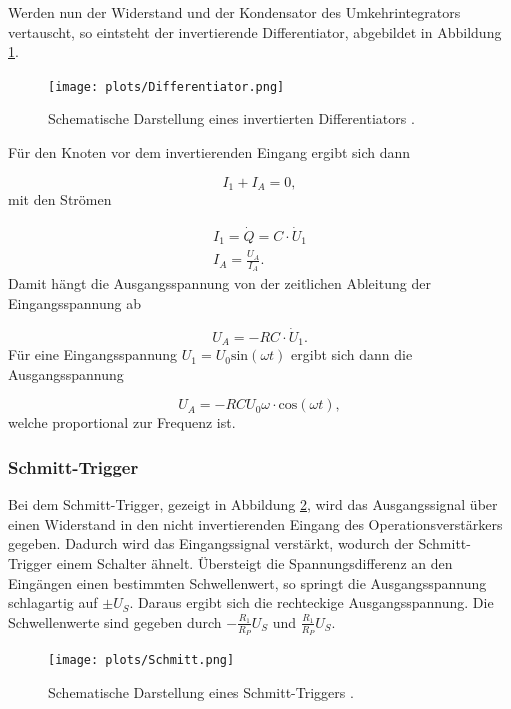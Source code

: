Werden nun der Widerstand und der Kondensator des Umkehrintegrators vertauscht, so eintsteht der invertierende Differentiator, abgebildet in Abbildung \ref{fig:4}.

\begin{figure}
    \centering
        \texttt{[image: plots/Differentiator.png]}
    \caption{Schematische Darstellung eines invertierten Differentiators \cite{Anleitung}.}
    \label{fig:4}
\end{figure}

Für den Knoten vor dem invertierenden Eingang ergibt sich dann

\begin{equation*}
    I_1 + I_A = 0,
\end{equation*}
mit den Strömen

\begin{align*}
    I_1 = \dot Q = C \cdot \dot U_1 \\
    I_A = \frac{U_A}{I_A}.
\end{align*}
Damit hängt die Ausgangsspannung von der zeitlichen Ableitung der Eingangsspannung ab

\begin{equation*}
    U_A = -R C \cdot \dot U_1.
\end{equation*}
Für eine Eingangsspannung $U_1 = U_0 \text{sin} (\omega t)$ ergibt sich dann die Ausgangsspannung 

\begin{equation}
    U_A = -RC U_0 \omega \cdot \text{cos} (\omega t),
\end{equation}
welche proportional zur Frequenz ist.



\subsubsection{Schmitt-Trigger}
\label{sec:Schmitt-Trigger}


Bei dem Schmitt-Trigger, gezeigt in Abbildung \ref{fig:5}, wird das Ausgangssignal über einen Widerstand in den nicht invertierenden Eingang des Operationsverstärkers gegeben.
Dadurch wird das Eingangssignal verstärkt, wodurch der Schmitt-Trigger einem Schalter ähnelt.
Übersteigt die Spannungsdifferenz an den Eingängen einen bestimmten Schwellenwert, so springt die Ausgangsspannung schlagartig auf $\pm U_S$.
Daraus ergibt sich die rechteckige Ausgangsspannung.
Die Schwellenwerte sind gegeben durch $- \frac{R_1}{R_P} U_S$ und $\frac{R_1}{R_P} U_S$.

\begin{figure}
    \centering
        \texttt{[image: plots/Schmitt.png]}
    \caption{Schematische Darstellung eines Schmitt-Triggers \cite{Anleitung}.}
    \label{fig:5}
\end{figure}

